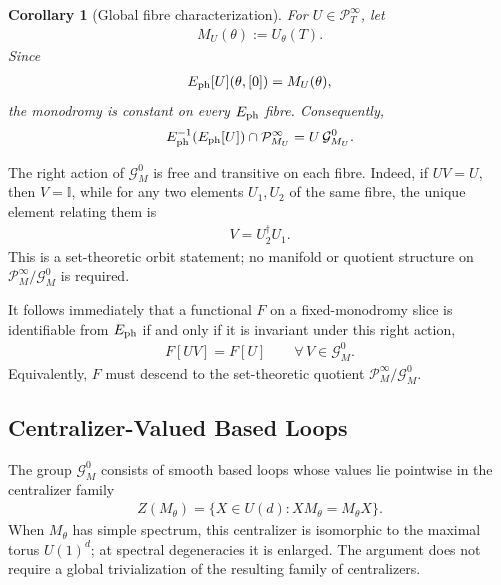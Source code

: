\documentclass[twocolumn,prl,aps,floatfix]{revtex4-2}
\newtheorem{corollary}{Corollary}
\begin{document}
\begin{corollary}[Global fibre characterization]
For $U\in\mathcal P_T^\infty$, let
\begin{align}
M_U(\theta):=U_\theta(T).
\end{align}
Since
\begin{align}
E_{\rm ph}[U](\theta,[0])=M_U(\theta),
\end{align}
the monodromy is constant on every $E_{\rm ph}$ fibre. Consequently,
\begin{align}
E_{\rm ph}^{-1}(E_{\rm ph}[U])
\cap
\mathcal P_{M_U}^\infty
=
U\,\mathcal G_{M_U}^0 .
\label{eq:global_fibre}
\end{align}
\end{corollary}

The right action of $\mathcal G_M^0$ is free and transitive on each fibre. Indeed, if $UV=U$, then $V=\mathbb I$, while for any two elements $U_1,U_2$ of the same fibre, the unique element relating them is
\begin{align}
V=U_2^\dagger U_1.
\end{align}
This is a set-theoretic orbit statement; no manifold or quotient structure on $\mathcal P_M^\infty/\mathcal G_M^0$ is required.

It follows immediately that a functional $F$ on a fixed-monodromy slice is identifiable from $E_{\rm ph}$ if and only if it is invariant under this right action,
\begin{align}
F[UV]=F[U]
\qquad
\forall\,V\in\mathcal G_M^0.
\label{eq:fibre_invariance}
\end{align}
Equivalently, $F$ must descend to the set-theoretic quotient
$\mathcal P_M^\infty/\mathcal G_M^0$.

\subsection{Centralizer-Valued Based Loops}

The group $\mathcal G_M^0$ consists of smooth based loops whose values lie pointwise in the centralizer family
\begin{align}
Z(M_\theta)
=
\{X\in U(d):XM_\theta=M_\theta X\}.
\end{align}
When $M_\theta$ has simple spectrum, this centralizer is isomorphic to the maximal torus $U(1)^d$; at spectral degeneracies it is enlarged. The argument does not require a global trivialization of the resulting family of centralizers.
\end{document}
